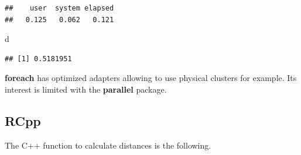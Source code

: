 \documentclass[
  12pt,
  american,
  a4paper,
  extrafontsizes,onecolumn,openright
  ]{memoir}
\newenvironment{Shaded}{\begin{snugshade}}{\end{snugshade}}
\newcommand{\NormalTok}[1]{#1}
\begin{document}
\begin{verbatim}
##    user  system elapsed 
##   0.125   0.062   0.121
\end{verbatim}

\begin{Shaded}
\begin{Highlighting}[]
\NormalTok{d}
\end{Highlighting}
\end{Shaded}

\begin{verbatim}
## [1] 0.5181951
\end{verbatim}

\normalsize

\textbf{foreach} has optimized adapters allowing to use physical clusters for example.
Its interest is limited with the \textbf{parallel} package.

\hypertarget{rcpp}{%
\subsection{RCpp}\label{rcpp}}

The C++ function to calculate distances is the following.

\scriptsize
\end{document}
